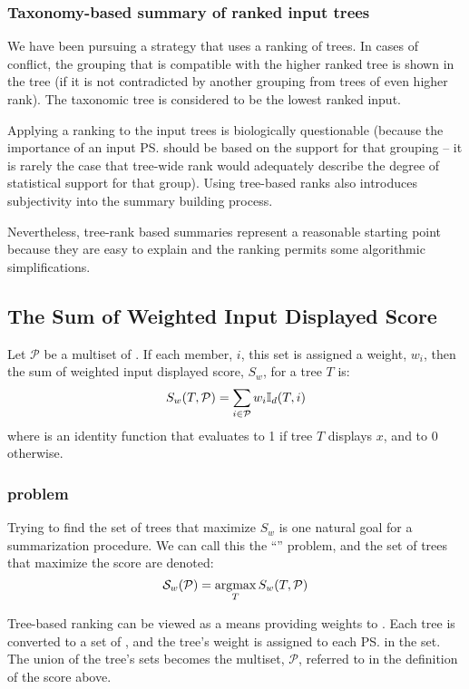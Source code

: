 \documentclass[11pt]{article}
\begin{document}
\subsubsection{Taxonomy-based summary of ranked input trees}
We have been pursuing a strategy that uses a ranking of trees.
In cases of conflict, the grouping that is compatible with the 
    higher ranked tree is shown in the tree (if it is not contradicted by 
    another grouping from trees of even higher rank).
 The taxonomic tree is considered to be the lowest ranked input.

Applying a ranking to the input trees is biologically questionable (because
    the importance of an input \ps should be based on the support for that
    grouping -- it is rarely the case that tree-wide rank would adequately
    describe the degree of statistical support for that group).
Using tree-based ranks also introduces subjectivity into the summary building process.

Nevertheless, tree-rank based summaries represent a reasonable starting point
    because they are easy to explain and the ranking permits some algorithmic
    simplifications.

\subsection{The Sum of Weighted Input \PSs Displayed Score}
Let $\mathcal{P}$ be a multiset of \pss.
If each member, $i$, this set is assigned a weight, $w_i$, then the 
sum of weighted input \pss displayed score, $S_w$, for a tree $T$ is:
\begin{equation}
    S_w(T, \mathcal{P}) = \sum_{i\in \mathcal{P}} w_i \mathbb{I}_d(T, i)
\end{equation}
where {} is an identity function that evaluates to 1 if tree $T$
        displays $x$, and to 0 otherwise.

\subsubsection{\MSWIPSD problem}
Trying to find the set of trees that maximize $S_w$ is one natural
    goal for a summarization procedure.
We can call this the ``\MSWIPSD''
problem,
    and the set of trees that maximize the score are denoted:
\begin{equation}
    \mathcal{S}_{w}(\mathcal{P}) = \operatorname*{\arg\!\max}_T S_w(T,\mathcal{P}) 
\end{equation}

Tree-based ranking can be viewed as a means providing weights to \pss.
Each tree is converted to a set of \pss, and the tree's weight is 
    assigned to each \ps in the set.
The union of the tree's sets becomes the multiset, $\mathcal{P}$, referred to
    in the definition of the score above.
\end{document}
